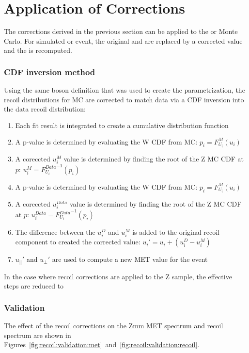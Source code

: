\section{Application of Corrections}\label{ch:recoil:apply}
The corrections derived in the previous section can be applied to the \W or \Z Monte Carlo. For simulated \W or \Z event, the original \upar and \uprp are replaced by a corrected value and the \met is recomputed. 
\subsubsection{CDF inversion method} \label{ch10:recoil:apply}
Using the same boson \pt definition that was used to create the parametrization, the recoil distributions for MC are corrected to match data via a CDF inversion into the data recoil distribution: 
\begin{enumerate}
    \item Each fit result is integrated to create a cumulative distribution function
    \item A p-value is determined by evaluating the W CDF from MC: $p_{i}=F_{U_{i}}^{M}(u_{i})$
    \item A coreccted $u_i^{M}$ value is determined by finding the root of the Z MC CDF at $p$: $u_{i}^{M}={F_{U_{i}}^{Data}}^{-1}(p_{i})$
    \item A p-value is determined by evaluating the W CDF from MC: $p_{i}=F_{U_{i}}^{M}(u_{i})$
    \item A coreccted $u_i^{Data}$ value is determined by finding the root of the Z MC CDF at $p$: $u_{i}^{Data}={F_{U_{i}}^{Data}}^{-1}(p_{i})$
    \item The difference between the $u_i^D$ and $u_i^M$ is added to the original recoil component to created the corrected value:  $u_{i}' = u_{i} + (u_i^D - u_i^M) $
    \item $u_{||}'$ and $u_{\perp}'$ are used to compute a new MET value for the event
\end{enumerate}
In the case where recoil corrections are applied to the Z sample, the effective steps are reduced to  

\subsubsection{Validation}
The effect of the recoil corrections on the Zmm MET spectrum and recoil spectrum are shown in Figures~\ref{fig:recoil:validation:met}~and~\ref{fig:recoil:validation:recoil}.


